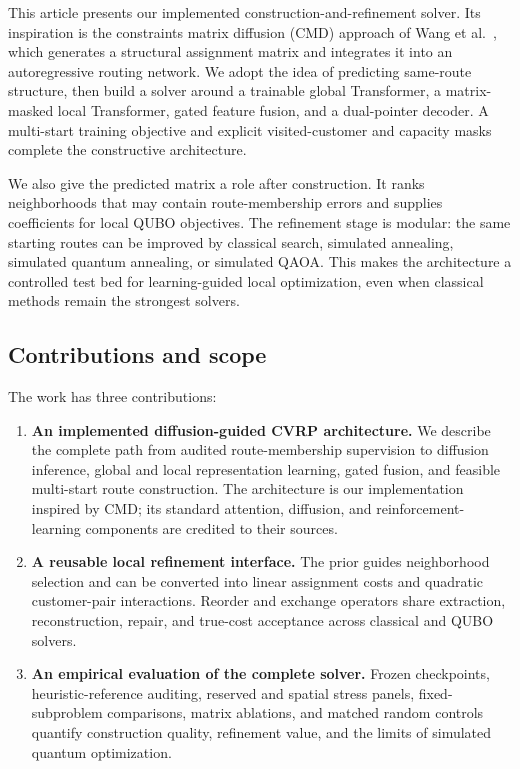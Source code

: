 \documentclass[11pt,a4paper]{article}
\begin{document}
This article presents our implemented construction-and-refinement solver.
Its inspiration is the constraints matrix diffusion (CMD) approach of
Wang et al.~\cite{wang2026cmd}, which generates a structural assignment
matrix and integrates it into an autoregressive routing network. We adopt
the idea of predicting same-route structure, then build a solver around
a trainable global Transformer, a matrix-masked local Transformer, gated
feature fusion, and a dual-pointer decoder. A multi-start training objective
and explicit visited-customer and capacity masks complete the constructive
architecture.

We also give the predicted matrix a role after construction. It ranks
neighborhoods that may contain route-membership errors and supplies
coefficients for local QUBO objectives. The refinement stage is modular:
the same starting routes can be improved by classical search, simulated
annealing, simulated quantum annealing, or simulated QAOA. This makes the
architecture a controlled test bed for learning-guided local optimization,
even when classical methods remain the strongest solvers.

\subsection{Contributions and scope}

The work has three contributions:
\begin{enumerate}
 \item \textbf{An implemented diffusion-guided CVRP architecture.}
 We describe the complete path from audited route-membership supervision
 to diffusion inference, global and local representation learning, gated
 fusion, and feasible multi-start route construction. The architecture is
 our implementation inspired by CMD; its standard attention, diffusion,
 and reinforcement-learning components are credited to their sources.
 \item \textbf{A reusable local refinement interface.}
 The prior guides neighborhood selection and can be converted into linear
 assignment costs and quadratic customer-pair interactions. Reorder and
 exchange operators share extraction, reconstruction, repair, and true-cost
 acceptance across classical and QUBO solvers.
 \item \textbf{An empirical evaluation of the complete solver.}
 Frozen checkpoints, heuristic-reference auditing, reserved and spatial
 stress panels, fixed-subproblem comparisons, matrix ablations, and
 matched random controls quantify construction quality, refinement value,
 and the limits of simulated quantum optimization.
\end{enumerate}
\end{document}
